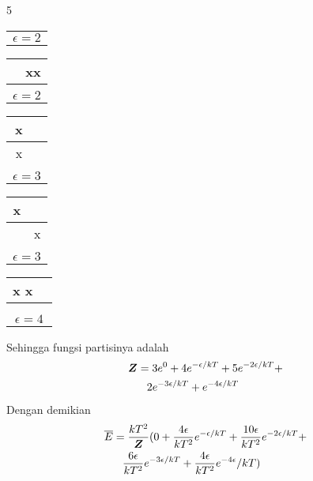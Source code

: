 \documentclass[a4paper  , 6 pt]{article}
\begin{document}
\begin{tiny}
\begin{multicols} {5}
\begin{tabular}{|c | c| }
 &   \\
\hline
\multicolumn{2}{|c|}{$\epsilon = 2$} \\ \hline
\end{tabular}
\begin{tabular}{|c | c| }
 \cline{1-1}  \\ \hline
 & xx \\ \hline 
 &   \\
\hline
\multicolumn{2}{|c|}{$\epsilon = 2$} \\ \hline
\end{tabular} \newline
\begin{tabular}{|c | c| }
 \cline{1-1}x  \\ \hline
x &  \\ \hline 
 &   \\
\hline
\multicolumn{2}{|c|}{$\epsilon = 3$} \\ \hline
\end{tabular}
\begin{tabular}{|c | c| }
 \cline{1-1}x  \\ \hline
 & x \\ \hline 
 &   \\
\hline
\multicolumn{2}{|c|}{$\epsilon = 3$} \\ \hline
\end{tabular}
\begin{tabular}{|c | c| }
 \cline{1-1}x x \\ \hline
 &  \\ \hline 
 &   \\
\hline
\multicolumn{2}{|c|}{$\epsilon = 4$} \\ \hline
\end{tabular} \newline
Sehingga fungsi partisinya adalah
\begin{align}
\boldsymbol{Z}& = 3e^0 + 4 e^{-\epsilon /kT} + 5 e^{- 2 \epsilon /kT} + \nonumber \\
& \hspace{0.3 cm } 2e^{- 3 \epsilon /kT} + e^{-4 \epsilon /kT}
\end{align}
Dengan demikian 
\begin{align}
\overline{E}& = \frac{kT^2}{\boldsymbol{Z}} (0+ \frac{4\epsilon}{kT^2} e^{-\epsilon /kT} + \frac{10 \epsilon}{kT^2} e^{- 2 \epsilon /kT} + \nonumber \\
& \hspace{0.3 cm } \frac{6 \epsilon }{kT^2} e^{-3 \epsilon /kT} + \frac{4 \epsilon}{kT^2} e^{- 4 \epsilon}/kT)

\end{align}
\end{multicols}
\end{tiny}
\end{document}
